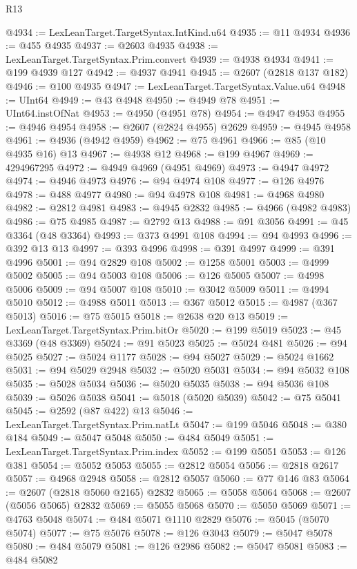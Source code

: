 \begin{lexlean}{R13}
\begin{coremodule}
@4934 := LexLeanTarget.TargetSyntax.IntKind.u64
@4935 := @11 @4934
@4936 := @455 @4935
@4937 := @2603 @4935
@4938 := LexLeanTarget.TargetSyntax.Prim.convert
@4939 := @4938 @4934
@4941 := @199 @4939 @127
@4942 := @4937 @4941
@4945 := @2607 (@2818 @137 @182)
@4946 := @100 @4935
@4947 := LexLeanTarget.TargetSyntax.Value.u64
@4948 := UInt64
@4949 := @43 @4948
@4950 := @4949 @78
@4951 := UInt64.instOfNat
@4953 := @4950 (@4951 @78)
@4954 := @4947 @4953
@4955 := @4946 @4954
@4958 := @2607 (@2824 @4955) @2629
@4959 := @4945 @4958
@4961 := @4936 (@4942 @4959)
@4962 := @75 @4961
@4966 := @85 (@10 @4935 @16) @13
@4967 := @4938 @12
@4968 := @199 @4967
@4969 := 4294967295
@4972 := @4949 @4969 (@4951 @4969)
@4973 := @4947 @4972
@4974 := @4946 @4973
@4976 := @94 @4974 @108
@4977 := @126 @4976
@4978 := @488 @4977
@4980 := @94 @4978 @108
@4981 := @4968 @4980
@4982 := @2812 @4981
@4983 := @4945 @2832
@4985 := @4966 (@4982 @4983)
@4986 := @75 @4985
@4987 := @2792 @13
@4988 := @91 @3056
@4991 := @45 @3364 (@48 @3364)
@4993 := @373 @4991 @108
@4994 := @94 @4993
@4996 := @392 @13 @13
@4997 := @393 @4996
@4998 := @391 @4997
@4999 := @391 @4996
@5001 := @94 @2829 @108
@5002 := @1258 @5001
@5003 := @4999 @5002
@5005 := @94 @5003 @108
@5006 := @126 @5005
@5007 := @4998 @5006
@5009 := @94 @5007 @108
@5010 := @3042 @5009
@5011 := @4994 @5010
@5012 := @4988 @5011
@5013 := @367 @5012
@5015 := @4987 (@367 @5013)
@5016 := @75 @5015
@5018 := @2638 @20 @13
@5019 := LexLeanTarget.TargetSyntax.Prim.bitOr
@5020 := @199 @5019
@5023 := @45 @3369 (@48 @3369)
@5024 := @91 @5023
@5025 := @5024 @481
@5026 := @94 @5025
@5027 := @5024 @1177
@5028 := @94 @5027
@5029 := @5024 @1662
@5031 := @94 @5029 @2948
@5032 := @5020 @5031
@5034 := @94 @5032 @108
@5035 := @5028 @5034
@5036 := @5020 @5035
@5038 := @94 @5036 @108
@5039 := @5026 @5038
@5041 := @5018 (@5020 @5039)
@5042 := @75 @5041
@5045 := @2592 (@87 @422) @13
@5046 := LexLeanTarget.TargetSyntax.Prim.natLt
@5047 := @199 @5046
@5048 := @380 @184
@5049 := @5047 @5048
@5050 := @484 @5049
@5051 := LexLeanTarget.TargetSyntax.Prim.index
@5052 := @199 @5051
@5053 := @126 @381
@5054 := @5052 @5053
@5055 := @2812 @5054
@5056 := @2818 @2617
@5057 := @4968 @2948
@5058 := @2812 @5057
@5060 := @77 @146 @83
@5064 := @2607 (@2818 @5060 @2165) @2832
@5065 := @5058 @5064
@5068 := @2607 (@5056 @5065) @2832
@5069 := @5055 @5068
@5070 := @5050 @5069
@5071 := @4763 @5048
@5074 := @484 @5071 @1110 @2829
@5076 := @5045 (@5070 @5074)
@5077 := @75 @5076
@5078 := @126 @3043
@5079 := @5047 @5078
@5080 := @484 @5079
@5081 := @126 @2986
@5082 := @5047 @5081
@5083 := @484 @5082

\end{coremodule}
\end{lexlean}
